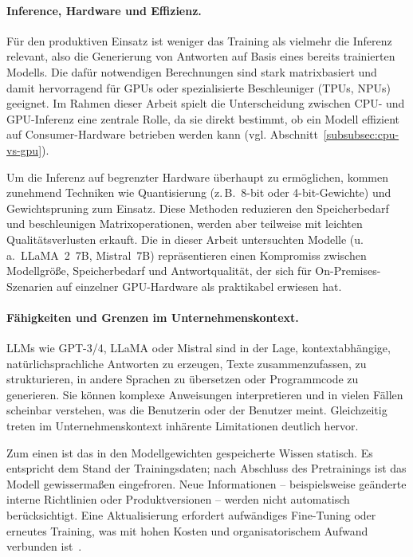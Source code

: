 \paragraph{Inference, Hardware und Effizienz.}

Für den produktiven Einsatz ist weniger das Training als vielmehr die Inferenz relevant, also die Generierung von Antworten auf Basis eines bereits trainierten Modells.
Die dafür notwendigen Berechnungen sind stark matrixbasiert und damit hervorragend für GPUs oder spezialisierte Beschleuniger (TPUs, NPUs) geeignet.
Im Rahmen dieser Arbeit spielt die Unterscheidung zwischen CPU- und GPU-Inferenz eine zentrale Rolle, da sie direkt bestimmt, ob ein Modell effizient auf Consumer-Hardware betrieben werden kann (vgl. Abschnitt~\ref{subsubsec:cpu-vs-gpu}).

Um die Inferenz auf begrenzter Hardware überhaupt zu ermöglichen, kommen zunehmend Techniken wie Quantisierung (z.\,B.\ 8-bit oder 4-bit-Gewichte) und Gewichtspruning zum Einsatz.
Diese Methoden reduzieren den Speicherbedarf und beschleunigen Matrixoperationen, werden aber teilweise mit leichten Qualitätsverlusten erkauft.
Die in dieser Arbeit untersuchten Modelle (u.\,a.\ LLaMA~2~7B, Mistral~7B) repräsentieren einen Kompromiss zwischen Modellgröße, Speicherbedarf und Antwortqualität, der sich für On-Premises-Szenarien auf einzelner GPU-Hardware als praktikabel erwiesen hat.

\paragraph{Fähigkeiten und Grenzen im Unternehmenskontext.}

LLMs wie GPT-3/4, LLaMA oder Mistral sind in der Lage, kontextabhängige, natürlichsprachliche Antworten zu erzeugen, Texte zusammenzufassen, zu strukturieren, in andere Sprachen zu übersetzen oder Programmcode zu generieren.
Sie können komplexe Anweisungen interpretieren und in vielen Fällen scheinbar \glqq verstehen\grqq{}, was die Benutzerin oder der Benutzer meint.
Gleichzeitig treten im Unternehmenskontext inhärente Limitationen deutlich hervor.

Zum einen ist das in den Modellgewichten gespeicherte Wissen statisch.
Es entspricht dem Stand der Trainingsdaten; nach Abschluss des Pretrainings ist das Modell gewissermaßen \glqq eingefroren\grqq{}.
Neue Informationen – beispielsweise geänderte interne Richtlinien oder Produktversionen – werden nicht automatisch berücksichtigt.
Eine Aktualisierung erfordert aufwändiges Fine-Tuning oder erneutes Training, was mit hohen Kosten und organisatorischem Aufwand verbunden ist~\cite{lewis2020rag,gao2023retrieval}.

